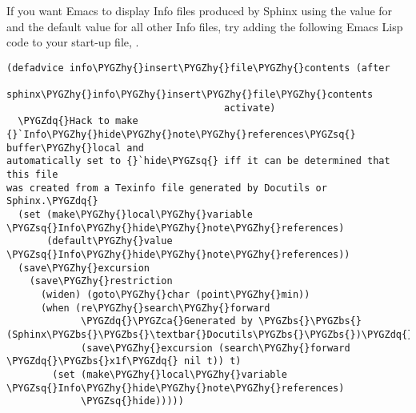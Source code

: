 \documentclass[letterpaper,10pt,english]{sphinxmanual}
\def\PYGZbs{\char`\\}
\def\PYGZca{\char`\^}
\def\PYGZhy{\char`\-}
\def\PYGZsq{\char`\'}
\def\PYGZdq{\char`\"}
\renewcommand\PYGZsq{\textquotesingle}
\begin{document}
If you want Emacs to display Info files produced by Sphinx using the value
 for  and the default value for all other
Info files, try adding the following Emacs Lisp code to your start-up file,
.

\begin{Verbatim}[commandchars=\\\{\}]
(defadvice info\PYGZhy{}insert\PYGZhy{}file\PYGZhy{}contents (after
                                      sphinx\PYGZhy{}info\PYGZhy{}insert\PYGZhy{}file\PYGZhy{}contents
                                      activate)
  \PYGZdq{}Hack to make {}`Info\PYGZhy{}hide\PYGZhy{}note\PYGZhy{}references\PYGZsq{} buffer\PYGZhy{}local and
automatically set to {}`hide\PYGZsq{} iff it can be determined that this file
was created from a Texinfo file generated by Docutils or Sphinx.\PYGZdq{}
  (set (make\PYGZhy{}local\PYGZhy{}variable \PYGZsq{}Info\PYGZhy{}hide\PYGZhy{}note\PYGZhy{}references)
       (default\PYGZhy{}value \PYGZsq{}Info\PYGZhy{}hide\PYGZhy{}note\PYGZhy{}references))
  (save\PYGZhy{}excursion
    (save\PYGZhy{}restriction
      (widen) (goto\PYGZhy{}char (point\PYGZhy{}min))
      (when (re\PYGZhy{}search\PYGZhy{}forward
             \PYGZdq{}\PYGZca{}Generated by \PYGZbs{}\PYGZbs{}(Sphinx\PYGZbs{}\PYGZbs{}\textbar{}Docutils\PYGZbs{}\PYGZbs{})\PYGZdq{}
             (save\PYGZhy{}excursion (search\PYGZhy{}forward \PYGZdq{}\PYGZbs{}x1f\PYGZdq{} nil t)) t)
        (set (make\PYGZhy{}local\PYGZhy{}variable \PYGZsq{}Info\PYGZhy{}hide\PYGZhy{}note\PYGZhy{}references)
             \PYGZsq{}hide)))))
\end{Verbatim}
\end{document}
